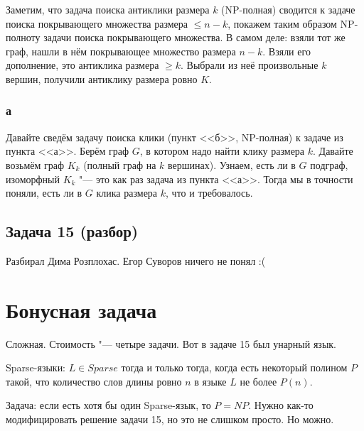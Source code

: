 		Заметим, что задача поиска антиклики размера $k$ (NP-полная) сводится к задаче поиска
		покрывающего множества размера $\le n-k$, покажем таким образом NP-полноту задачи
		поиска покрывающего множества.
		В самом деле: взяли тот же граф, нашли в нём покрывающее множество размера $n-k$.
		Взяли его дополнение, это антиклика размера $\ge k$.
		Выбрали из неё произвольные $k$ вершин, получили антиклику размера ровно $K$.

	\subsubsection{а}
		Давайте сведём задачу поиска клики (пункт <<б>>, NP-полная) к задаче из пункта <<а>>.
		Берём граф $G$, в котором надо найти клику размера $k$.
		Давайте возьмём граф $K_k$ (полный граф на $k$ вершинах).
		Узнаем, есть ли в $G$ подграф, изоморфный $K_k$ "--- это как раз задача из пункта <<а>>.
		Тогда мы в точности поняли, есть ли в $G$ клика размера $k$, что и требовалось.

\subsection{Задача 15 (разбор)}
	Разбирал Дима Розплохас.
	Егор Суворов ничего не понял :(

	\TODO

\section{Бонусная задача}
	Сложная. Стоимость "--- четыре задачи.
	Вот в задаче 15 был унарный язык.
	\begin{Def}
		Sparse-языки: $L \in Sparse$ тогда и только тогда, когда есть некоторый
		полином $P$ такой, что количество слов длины ровно $n$ в языке $L$ не более
		$P(n)$.
	\end{Def}
	Задача: если есть хотя бы один Sparse-язык, то $P=NP$.
	Нужно как-то модифицировать решение задачи 15, но это не слишком просто.
	Но можно.
